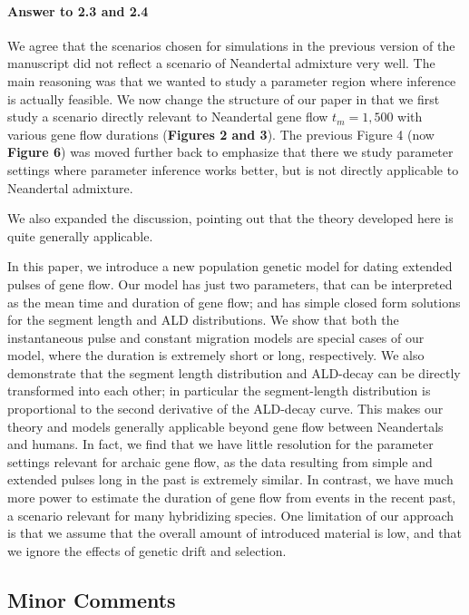 \documentclass[11pt]{article}
\let\oldparagraph\paragraph
\renewcommand{\paragraph}[1]{\oldparagraph{#1}\mbox{}}
\begin{document}
\paragraph{Answer to 2.3 and 2.4}
We agree that the scenarios chosen for simulations in the previous version of the manuscript did not reflect a scenario of Neandertal admixture very well. The main reasoning was that we wanted to study a parameter region where inference is actually feasible. We now change the structure of our paper in that we first study a scenario directly relevant to Neandertal gene flow $t_m=1,500$  with various gene flow durations (\textbf{Figures 2 and 3}). The previous Figure 4 (now \textbf{Figure 6}) was moved further back to emphasize that there we study parameter settings where parameter inference works better, but is not directly applicable to Neandertal admixture.

We also expanded  the discussion, pointing out that the theory developed here is quite generally applicable.

\begin{mdframed}[hidealllines=true,backgroundcolor=grey!20]
In this paper, we introduce a new population genetic model for dating extended pulses of gene flow. Our model has just two parameters, that can be interpreted as the mean time and duration of gene flow; and has simple closed form solutions for the segment length and ALD distributions. We show that both the instantaneous pulse and constant migration models are special cases of our model, where the duration is extremely short or long, respectively. We also demonstrate that the segment length distribution and ALD-decay can be directly transformed into each other; in particular the segment-length distribution is proportional to the second derivative of the ALD-decay curve. This makes our theory and models generally applicable beyond gene flow between Neandertals and humans. In fact, we find that we have little resolution for the parameter settings relevant for archaic gene flow, as the data resulting from simple and extended pulses long in the past is extremely similar. In contrast, we have much more power to estimate the duration of gene flow from events in the recent past, a scenario relevant for many hybridizing species. One limitation of our approach is that we assume that the overall amount of introduced material is low, and that we ignore the effects of genetic drift and selection.\end{mdframed}



\subsection{Minor Comments}\label{Minor Comments}
\end{document}
